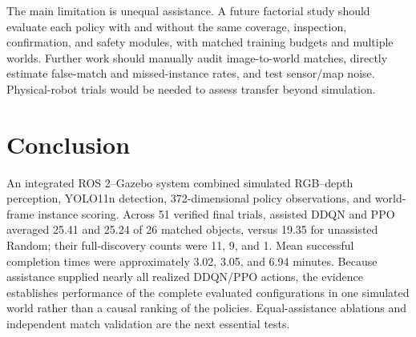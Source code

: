 \documentclass[conference]{IEEEtran}
\begin{document}
The main limitation is unequal assistance. A future factorial study should evaluate each policy with and without the same coverage, inspection, confirmation, and safety modules, with matched training budgets and multiple worlds. Further work should manually audit image-to-world matches, directly estimate false-match and missed-instance rates, and test sensor/map noise. Physical-robot trials would be needed to assess transfer beyond simulation.

\FloatBarrier
\section{Conclusion}
An integrated ROS 2--Gazebo system combined simulated RGB--depth perception, YOLO11n detection, 372-dimensional policy observations, and world-frame instance scoring. Across 51 verified final trials, assisted DDQN and PPO averaged 25.41 and 25.24 of 26 matched objects, versus 19.35 for unassisted Random; their full-discovery counts were 11, 9, and 1. Mean successful completion times were approximately 3.02, 3.05, and 6.94 minutes. Because assistance supplied nearly all realized DDQN/PPO actions, the evidence establishes performance of the complete evaluated configurations in one simulated world rather than a causal ranking of the policies. Equal-assistance ablations and independent match validation are the next essential tests.
\end{document}
